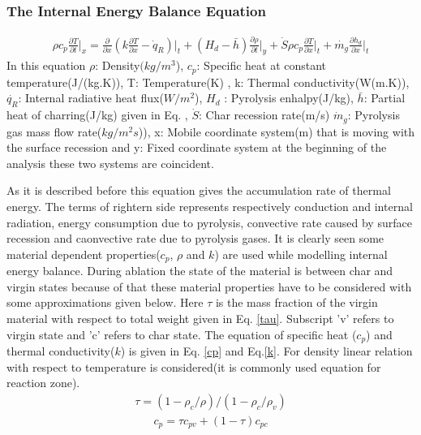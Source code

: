 \documentclass[a4paper, 12pt]{article} %
\begin{document}
\subsubsection{The Internal Energy Balance Equation}

\begin{eqnarray} \label{en_eq}
\rho c_p \frac{\partial T}{\partial t}\biggr|_x=\frac{\partial}{\partial x}(k\frac{\partial T}{\partial x}-\dot{q}_R)\biggr|_t+(H_d-\bar{h})\frac{\partial \rho}{\partial t}\biggr|_y+\dot{S} \rho c_p\frac{\partial T}{\partial x}\biggr|_t+\dot{m_g}\frac{\partial h_d}{\partial x}\biggr|_t
\end{eqnarray}
In this equation $\rho$: Density$(kg/m^3$), $c_p$: Specific heat at constant temperature(J/(kg.K)), T: Temperature(K) , k: Thermal conductivity(W(m.K)), $\dot{q_R}$: Internal radiative heat flux($W/m^2$), $H_d$ : Pyrolysis enhalpy(J/kg), $\bar{h}$: Partial heat of charring(J/kg) given in Eq. , $\dot{S}$: Char recession rate(m/s)  $\dot{m}_g $: Pyrolysis gas mass flow rate($kg/m^2s$)), x: Mobile coordinate system(m) that is moving with the surface recession and y: Fixed coordinate system at the beginning of the analysis these two systems are coincident. \par
As it is described before this equation gives the accumulation rate of thermal energy. The terms of rightern side represents respectively conduction and internal radiation, energy consumption due to pyrolysis, convective rate caused by surface recession and caonvective rate due to pyrolysis gases. It is clearly seen some material dependent properties($c_p$, $\rho$ and $k$) are used while modelling internal energy balance. During ablation the state of the material is between char and virgin states because of that these material properties have to be considered with some approximations given below. Here $\tau$ is the mass fraction of the virgin material with respect to total weight given in Eq. \ref{tau}. Subscript 'v' refers to virgin state and 'c' refers to char state. The equation of specific heat ($c_p$) and thermal conductivity($k$) is given in Eq. \ref{cp} and Eq.\ref{k}. For density linear relation with respect to temperature is considered(it is commonly used equation for reaction zone).
\begin{eqnarray} \label{tau}
\tau=(1-\rho _c/\rho)/(1-\rho _c /\rho _v)
\end{eqnarray}
\begin{eqnarray} \label{cp}
c_p=\tau c_{pv}+(1-\tau)c_{pc}
\end{eqnarray}
\end{document}

